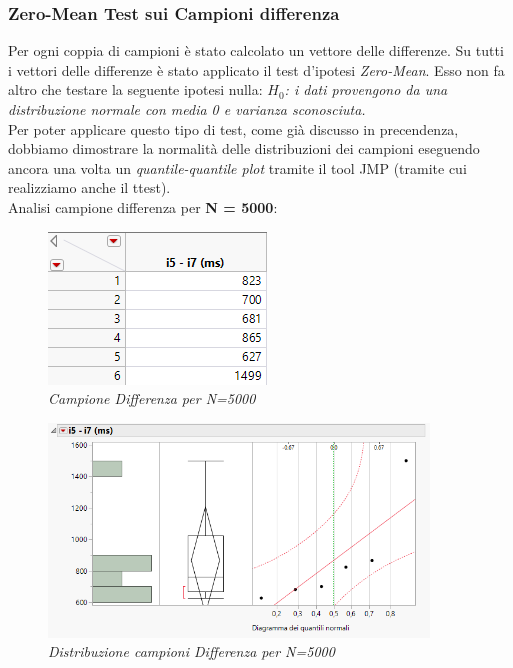 \subsubsection{Zero-Mean Test sui Campioni differenza}
Per ogni coppia di campioni è stato calcolato un vettore delle differenze. Su tutti i vettori delle differenze è stato applicato il test d'ipotesi \textit{Zero-Mean}. Esso non fa altro che testare la seguente ipotesi nulla:
\textit{$H_{0}$: i dati provengono da una distribuzione normale con media 0 e varianza sconosciuta.}
\\
Per poter applicare questo tipo di test, come già discusso in precendenza, dobbiamo dimostrare la normalità delle distribuzioni dei campioni eseguendo ancora una volta un \textit{quantile-quantile plot} tramite il tool JMP (tramite cui realizziamo anche il ttest).
\\
Analisi campione differenza per \textbf{N = 5000}:
\begin{figure}[H]
	\centering
	\includegraphics{img/hw0/diff1.png}
	\caption{\textit{Campione Differenza per N=5000}}
\end{figure}
\begin{figure}[H]
	\centering
	\includegraphics[width=0.9\textwidth]{img/hw0/statistiche5000_1.png}
	\caption{\textit{Distribuzione campioni Differenza per N=5000}}
\end{figure}
